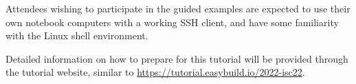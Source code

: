 Attendees wishing to participate in the guided examples are expected to use their
own notebook computers with a working SSH client, and have some familiarity with
the Linux shell environment.

Detailed information on how to prepare for this tutorial will be provided
through the tutorial website, similar to
\url{https://tutorial.easybuild.io/2022-isc22}.
